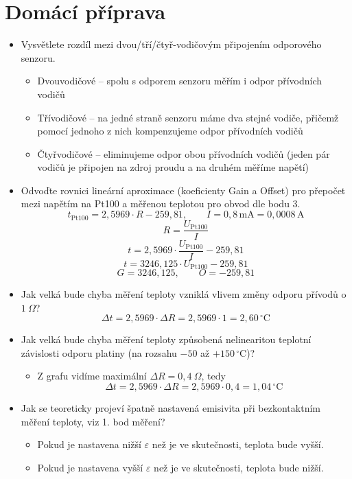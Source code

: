 \documentclass[a4paper,12pt]{article}
\newcommand{\unitC}{\,^\circ\mathrm{C}}
\begin{document}
\section{Domácí příprava}
\begin{itemize}
  \item Vysvětlete rozdíl mezi dvou/tří/čtyř-vodičovým připojením odporového senzoru.
    \begin{itemize}
      \item Dvouvodičové -- spolu s odporem senzoru měřím i odpor přívodních vodičů
      \item Třívodičové -- na jedné straně senzoru máme dva stejné vodiče, přičemž pomocí jednoho z nich kompenzujeme odpor přívodních vodičů
      \item Čtyřvodičové -- eliminujeme odpor obou přívodních vodičů (jeden pár vodičů je připojen na zdroj proudu a na druhém měříme napětí)
    \end{itemize}

  \item Odvoďte rovnici lineární aproximace (koeficienty Gain a Offset) pro přepočet mezi napětím na Pt100 a měřenou teplotou pro obvod dle bodu 3.
    $$
      t_{\mathrm{Pt100}} = 2{,}5969 \cdot R - 259{,}81,
      \qquad
      I = 0{,}8\,\mathrm{mA} = 0{,}0008\,\mathrm{A}
    $$
    $$
      R = \frac{U_{\mathrm{Pt100}}}{I}
    $$
    $$
      t = 2{,}5969 \cdot \frac{U_{\mathrm{Pt100}}}{I} - 259{,}81
    $$
    $$
      t = 3246{,}125 \cdot U_{\mathrm{Pt100}} - 259{,}81
    $$
    $$
      G = 3246{,}125,
      \qquad
      O = -259{,}81
    $$

  \item Jak velká bude chyba měření teploty vzniklá vlivem změny odporu přívodů o $1\ \Omega$?
    $$
      \Delta t = 2{,}5969 \cdot \Delta R = 2{,}5969 \cdot 1 = 2{,}60\unitC
    $$

  \item Jak velká bude chyba měření teploty způsobená nelinearitou teplotní závislosti odporu platiny (na rozsahu $-50$ až $+150\unitC$)?
    \begin{itemize}
      \item Z grafu vidíme maximální $\Delta R = 0{,}4\ \Omega$, tedy
      $$
        \Delta t = 2{,}5969 \cdot \Delta R = 2{,}5969 \cdot 0{,}4 = 1{,}04\unitC
      $$
    \end{itemize}

  \item Jak se teoreticky projeví špatně nastavená emisivita při bezkontaktním měření teploty, viz 1. bod měření?
    \begin{itemize}
      \item Pokud je nastavena nižší $\varepsilon$ než je ve skutečnosti, teplota bude vyšší.
      \item Pokud je nastavena vyšší $\varepsilon$ než je ve skutečnosti, teplota bude nižší.
    \end{itemize}
\end{itemize}
\end{document}
